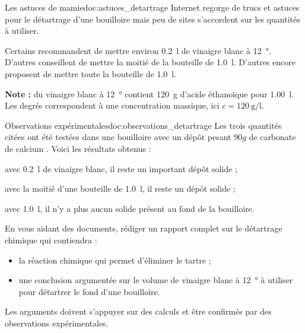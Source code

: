 \begin{doc}{Les astuces de mamie}{doc:astuces_detartrage}
  Internet regorge de trucs et astuces pour le détartrage d'une bouilloire mais peu de sites s'accordent sur les quantités à utiliser.

  Certains recommandent de mettre environ \qty{0,2}{\litre} de vinaigre blanc à \qty{12}{\degree}.
  D'autres conseillent de mettre la moitié de la bouteille de \qty{1,0}{\litre}.
  D'autres encore proposent de mettre toute la bouteille de \qty{1,0}{\litre}.
  
  \textbf{Note :} du vinaigre blanc à \qty{12}{\degree} contient \qty{120}{\g} d'acide éthanoïque pour \qty{1,00}{\litre}.
  Les degrés correspondent à une concentration massique, ici $c = \qty{120}{\g\per\litre}$.
\end{doc}

\begin{doc}{Observations expérimentales}{doc:observations_detartrage}
  Les trois quantités citées ont été testées dans une bouilloire avec un dépôt pesant $90 \unit{g}$ de carbonate de calcium .
  Voici les résultats obtenus :
  \begin{listePoints}
    \item avec \qty{0,2}{\litre} de vinaigre blanc, il reste un important dépôt solide ;
    \item avec la moitié d'une bouteille de \qty{1,0}{\litre}, il reste un dépôt solide ;
    \item avec \qty{1,0}{\litre}, il n'y a plus aucun solide présent au fond de la bouilloire.
  \end{listePoints}
\end{doc}


%
\numeroQuestion
En vous aidant des documents, rédiger un rapport complet sur le détartrage chimique qui contiendra :
\begin{itemize}
  \item la réaction chimique qui permet d'éliminer le tartre ;
  \item une conclusion argumentée sur le volume de vinaigre blanc à \qty{12}{\degree} à utiliser pour détartrer le fond d'une bouilloire.
\end{itemize}
Les arguments doivent s'appuyer sur des calculs et être confirmés par des observations expérimentales.

